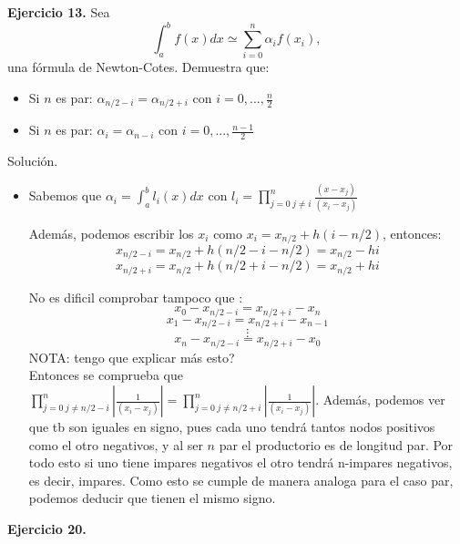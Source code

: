 \documentclass[11pt]{article}
\begin{document}
\textbf{Ejercicio 13.} Sea $$ \int_a^b f(x) dx \simeq \sum_{i=0}^n \alpha_i f(x_i),  $$
una fórmula de Newton-Cotes. Demuestra que:

\begin{itemize}
\item Si $n$ es par: $ \alpha_{n/2-i}=\alpha_{n/2+i}$ con $ i = 0,...,\frac{n}{2}$
\item Si $n$ es par: $ \alpha_{i}=\alpha_{n-i}$ con $ i = 0,...,\frac{n-1}{2}$
\end{itemize}

{Solución.\\}

\begin{itemize}
\item Sabemos que $\alpha_{i}=\int_a^b l_i(x) dx $ con $l_i = \prod_{j = 0  \ j\neq i}^n \frac{(x-x_j)}{(x_i-x_j)}$

Además, podemos escribir los $x_i$ como $x_i= x_{n/2} + h(i-n/2)$, entonces:   $$x_{n/2-i}  = x_{n/2} + h(n/2-i-n/2)   = x_{n/2} - hi $$ 
$$x_{n/2+i} = x_{n/2} + h(n/2+i-n/2) = x_ {n/2} + hi $$



No es dificil comprobar tampoco que :
$$  x_0 - x_{n/2-i} = x_{n/2+i}-x_n$$
$$ x_1 - x_{n/2-i} = x_{n/2+i}-x_{n-1}$$
$$\vdots$$
$$  x_n - x_{n/2-i} = x_{n/2+i}-x_0$$
NOTA: tengo que explicar más  esto?\\

Entonces se comprueba que $\prod_{j = 0  \ j\neq n/2-i}^n |\frac{1}{(x_i-x_j)}|=\prod_{j = 0  \ j\neq n/2+i}^n |\frac{1}{(x_i-x_j)}|$. Además, podemos ver que tb son iguales en signo, pues cada uno tendrá tantos nodos positivos como el otro negativos, y al ser $n$ par el productorio es de longitud par. Por todo esto si uno tiene impares negativos el otro tendrá  n-impares negativos, es decir, impares. Como esto se cumple de manera analoga para el caso par, podemos deducir que tienen el mismo signo.


\end{itemize}


\textbf{Ejercicio 20.}
\end{document}
